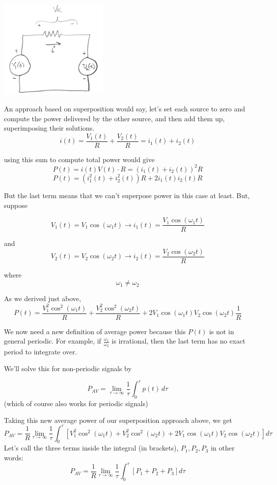 %
\includegraphics[width=0.4\textwidth]{figsChapt03/GP15083.png}



An approach based on superposition would say, let's set each
source to zero and compute the power delivered by the other source,
and then add them up, superimposing their solutions.
\[
i(t) = \frac{V_1(t)}{R} + \frac{V_2(t)}{R} = i_1(t) + i_2(t)
\]

using this sum to compute total power would give
\[
P(t) = i(t) V(t) \cdot R
= \left( i_1(t) + i_2(t) \right)^2 R
\]
\[
P(t) = \left( i_1^2(t) + i_2^2(t) \right) R + 2i_1(t) i_2(t) R
\]

But the last term means that we can't superpose power in this case at least.
But, suppose

\[
V_1(t) = V_1 \cos(\omega_1 t) \rightarrow i_1(t) = \frac{V_1 \cos(\omega_1 t)}{R}
\]

and
\[
V_2(t) = V_2 \cos(\omega_2 t) \rightarrow i_2(t) = \frac{V_2 \cos(\omega_2 t)}{R}
\]


where
\[
\omega_1 \neq \omega_2
\]

As we derived just above,
\[
P(t) = \frac{V_1^2 \cos^2(\omega_1 t)}{R} + \frac{V_2^2 \cos^2(\omega_2 t)}{R} + 2V_1 \cos(\omega_1 t) V_2 \cos(\omega_2 t) \frac{1}{R}
\]


We now need a new definition of average power because this $P(t)$ is not in general periodic.
For example, if $\frac{\omega_1}{\omega_2}$ is irrational, then the last term has no
exact period to integrate over.

We'll solve this for non-periodic signals  by

\[
P_{AV} = \lim_{\tau \rightarrow \infty} \frac{1}{\tau} \int_0^\tau p(t) \, d\tau
\]
(which of course also works for periodic
signals)

Taking this new average power of our superposition approach above, we get
\[
P_{AV} = \frac{1}{R} \lim_{\tau \rightarrow \infty} \frac{1}{\tau} \int_0^\tau \left[ V_1^2 \cos^2(\omega_1 t) + V_2^2 \cos^2(\omega_2 t) + 2V_1 \cos(\omega_1 t) V_2 \cos(\omega_2 t) \right] d\tau
\]
Let's call the three terms inside the integral (in brackets), $P_1, P_2, P_3$ in other words:
\[
P_{AV} =\frac{1}{R} \lim_{\tau \rightarrow \infty} \frac{1}{\tau} \int_0^\tau \left[
P_1 + P_2 + P_3 \right ] d\tau
\]

